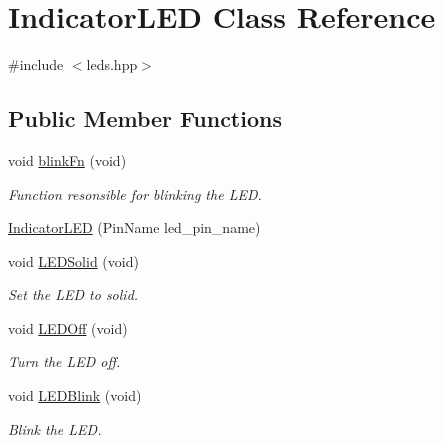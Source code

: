 \hypertarget{classIndicatorLED}{}\section{Indicator\+L\+ED Class Reference}
\label{classIndicatorLED}


{\ttfamily \#include $<$leds.\+hpp$>$}

\subsection*{Public Member Functions}
\begin{DoxyCompactItemize}
\item 
\mbox{\label{classIndicatorLED_a753a81e2d6745aff7aff3e716a3edb3a}} 
void \hyperlink{classIndicatorLED_a753a81e2d6745aff7aff3e716a3edb3a}{blink\+Fn} (void)
\begin{DoxyCompactList}\small\item\em Function resonsible for blinking the L\+ED. \end{DoxyCompactList}\item 
\hyperlink{classIndicatorLED_a1d1b6a18ce8abab30013f650587dcfe6}{Indicator\+L\+ED} (Pin\+Name led\+\_\+pin\+\_\+name)
\item 
\mbox{\label{classIndicatorLED_ae59857a2a4e9ec9f78220203a73a189e}} 
void \hyperlink{classIndicatorLED_ae59857a2a4e9ec9f78220203a73a189e}{L\+E\+D\+Solid} (void)
\begin{DoxyCompactList}\small\item\em Set the L\+ED to solid. \end{DoxyCompactList}\item 
\mbox{\label{classIndicatorLED_aba3ab5956e1c1cbfa1c7984c7c858c54}} 
void \hyperlink{classIndicatorLED_aba3ab5956e1c1cbfa1c7984c7c858c54}{L\+E\+D\+Off} (void)
\begin{DoxyCompactList}\small\item\em Turn the L\+ED off. \end{DoxyCompactList}\item 
\mbox{\label{classIndicatorLED_a04b4859fa0dd98be3bd454ab1cd6d19e}} 
void \hyperlink{classIndicatorLED_a04b4859fa0dd98be3bd454ab1cd6d19e}{L\+E\+D\+Blink} (void)
\begin{DoxyCompactList}\small\item\em Blink the L\+ED. \end{DoxyCompactList}\item 

\end{DoxyCompactItemize}
